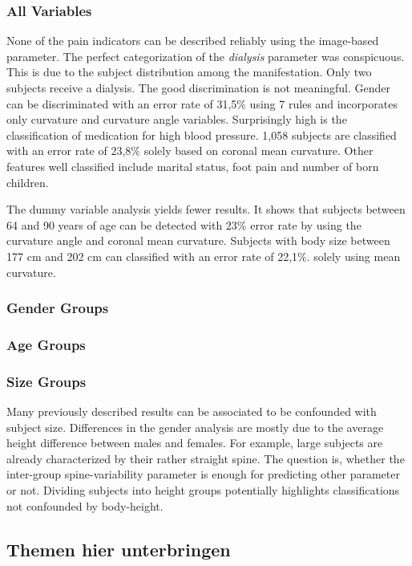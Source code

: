 \documentclass[a4paper,twoside]{style/article}
\begin{document}
\subsubsection{All Variables}
None of the pain indicators can be described reliably using the image-based parameter.
The perfect categorization of the \emph{dialysis} parameter was conspicuous.
This is due to the subject distribution among the manifestation.
Only two subjects receive a dialysis.
The good discrimination is not meaningful.
Gender can be discriminated with an error rate of 31,5\% using 7 rules and incorporates only curvature and curvature angle variables.
Surprisingly high is the classification of medication for high blood pressure.
1,058 subjects are classified with an error rate of 23,8\% solely based on coronal mean curvature.
Other features well classified include marital status, foot pain and number of born children.

The dummy variable analysis yields fewer results.
It shows that subjects between 64 and 90 years of age can be detected with 23\% error rate by using the curvature angle and coronal mean curvature.
Subjects with body size between 177 cm and 202 cm can classified with an error rate of 22,1\%. solely using mean curvature.
\subsubsection{Gender Groups}
\subsubsection{Age Groups}
\subsubsection{Size Groups}
Many previously described results can be associated to be confounded with subject size.
Differences in the gender analysis are mostly due to the average height difference between males and females.
For example, large subjects are already characterized by their rather straight spine.
%
The question is, whether the inter-group spine-variability parameter is enough for predicting other parameter or not.
Dividing subjects into height groups potentially highlights classifications not confounded by body-height.



\subsection{Themen hier unterbringen}
\end{document}
